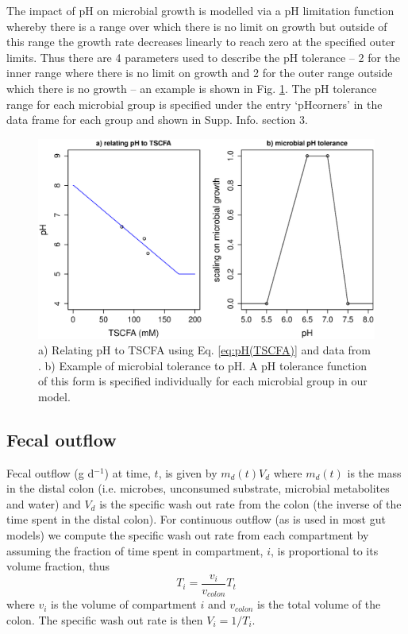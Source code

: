 \documentclass[a4paper]{article}
\begin{document}
The impact of pH on microbial growth is modelled via a pH limitation function whereby there is a range over which there is no limit on growth but outside of this range the growth rate decreases linearly to reach zero at the specified outer limits. Thus there are 4 parameters used to describe the pH tolerance -- 2 for the inner range where there is no limit on growth and 2 for the outer range outside which there is no growth -- an example is shown in Fig. \ref{fig:pHRelandTol}.
The pH tolerance range for each microbial group is specified under the entry `pHcorners' in the data frame for each group and shown in Supp. Info. section 3.

\begin{figure}
    \centering
    \includegraphics[scale=0.3]{images/pHTSCFAandTol.eps}
    \caption{a) Relating pH to TSCFA using Eq. \ref{eq:pH(TSCFA)} and data from \citep{cummings}. b) Example of microbial tolerance to pH. 
A pH tolerance function of this form is specified individually for each microbial group in our model.  %
}
    \label{fig:pHRelandTol}
\end{figure}


\subsection*{Fecal outflow}
Fecal outflow (g d$^{-1}$) at time, $t$, is given by $m_d(t)V_d$ where $m_d(t)$ is the mass in the distal colon (i.e. microbes, unconsumed substrate, microbial metabolites and water) and $V_d$ is the specific wash out rate from the colon (the inverse of the time spent in the distal colon).
For continuous outflow (as is used in most gut models) we compute the specific wash out rate from each compartment by assuming the fraction of time spent in compartment, $i$, is proportional to its volume fraction, thus 
\begin{equation}
    T_i=\frac{v_i}{v_{colon}}T_t
\end{equation}
where $v_i$ is the volume of compartment $i$ and $v_{colon}$ is the total volume of the colon. The specific wash out rate is then $V_i=1/T_i$.
\end{document}
